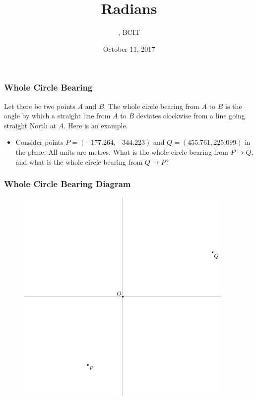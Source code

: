 \documentclass[xcolor=dvipsnames]{beamer}
\title{Radians}
\subtitle{{\CourseNumber}, BCIT}
\author{\CourseName}
\date{October 11, 2017}
\begin{document}
\begin{frame}
  \titlepage
\end{frame}

\begin{frame}
  \frametitle{Whole Circle Bearing}
  Let there be two points $A$ and $B$. The \alert{whole circle
    bearing} from $A$ to $B$ is the angle by which a straight line
  from $A$ to $B$ deviates clockwise from a line going straight North
  at $A$. Here is an example. 
  \begin{itemize}
  \item Consider points $P=(-177.264,-344.223)$ and
  $Q=(455.761,225.099)$ in the plane. All units are metres. What is
  the whole circle bearing from $P\rightarrow{}Q$, and what is the
  whole circle bearing from $Q\rightarrow{}P$?
  \end{itemize}
\end{frame}

\begin{frame}
  \frametitle{Whole Circle Bearing Diagram}
  \begin{figure}[h]
    \includegraphics[scale=.6]{./wcbc.png}
  \end{figure}
\end{frame}
\end{document}

